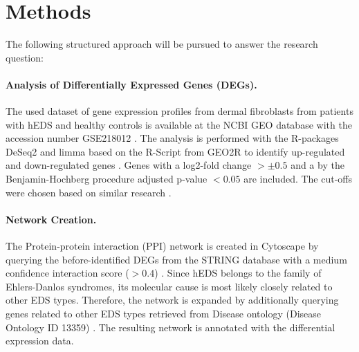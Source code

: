 \section{Methods}
The following structured approach will be pursued to answer the research question:

\paragraph{Analysis of Differentially Expressed Genes (DEGs).}\label{sec:methods-deg}
The used dataset of gene expression profiles from dermal fibroblasts from patients with hEDS and healthy controls is available at the NCBI GEO database with the accession number GSE218012 \cite{Ritelli2020}. The analysis is performed with the R-packages DeSeq2 and limma based on the R-Script from GEO2R to identify up-regulated and down-regulated genes \cite{DESeq2, limma}. Genes with a log2-fold change $> \pm 0.5$ and a by the Benjamin-Hochberg procedure adjusted p-value $< 0.05$ are included. The cut-offs were chosen based on similar research \cite{Karimizadeh2019, Lim2019}.

\paragraph{Network Creation.}
The Protein-protein interaction (PPI) network is created in Cytoscape \cite{Cytoscape} by querying the before-identified DEGs from the STRING database with a medium confidence interaction score ($> 0.4$) \cite{StringDB}. Since hEDS belongs to the family of Ehlers-Danlos syndromes, its molecular cause is most likely closely related to other EDS types. Therefore, the network is expanded by additionally querying genes related to other EDS types retrieved from Disease ontology (Disease Ontology ID 13359) \cite{DO}. The resulting network is annotated with the differential expression data.
	
